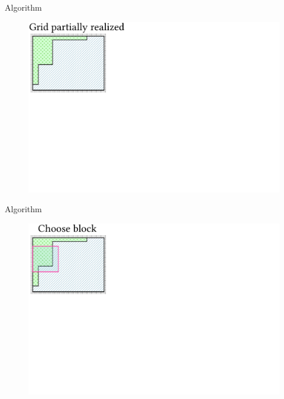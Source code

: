 \documentclass{beamer}
\begin{document}



  \begin{frame}[fragile]{Algorithm}
    \begin{figure}
      \includegraphics[width=\textwidth]{figs/poms_alg0.pdf}
    \end{figure}
  \end{frame}

  \begin{frame}[fragile]{Algorithm}
    \begin{figure}
      \includegraphics[width=\textwidth]{figs/poms_alg1.pdf}
    \end{figure}
  \end{frame}
\end{document}
